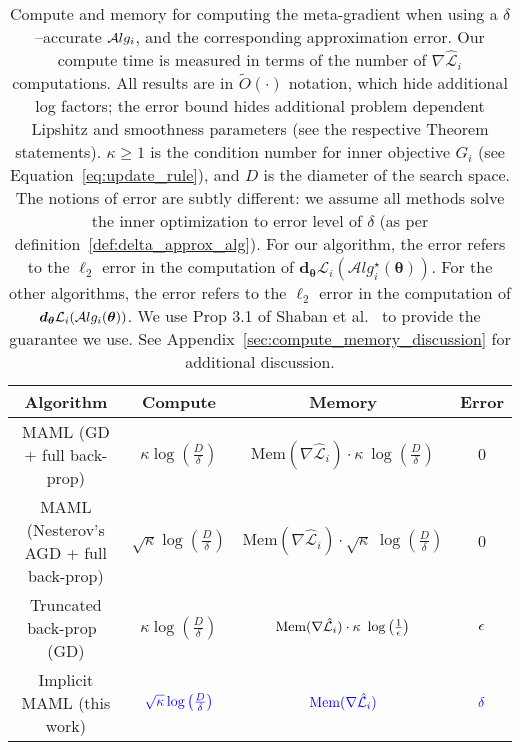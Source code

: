 \documentclass{article} \usepackage[nonatbib, final]{mod_neurips}
\newcommand{\prior}{{\bm{\theta}}}               \newcommand{\priorspace}{\Theta}
\newcommand{\fn}{\mathcal{L}}                  \newcommand{\udfn}{\tilde{\fn}}        \newcommand{\fnht}{\hat{\fn}}        \newcommand{\ud}{\alg}
\newcommand{\algstar}{\mathcal{A}lg^\star}
\newcommand{\grad}{\bm{d}}
\newcommand{\pgrad}{\nabla}
\begin{document}
\begin{table}[t!]
\caption{\label{table:compare}\footnotesize Compute and memory for computing the
  meta-gradient when using a $\delta$--accurate $\mathcal{A}lg_i$, and the
  corresponding approximation error. Our compute time is measured in
  terms of the number of $\pgrad \fnht_i$ computations. All results
  are in $\tilde O(\cdot)$ notation, which hide additional log factors; the error bound hides additional problem dependent Lipshitz and smoothness  parameters (see the respective Theorem statements). 
$\kappa \geq 1$ is the condition number for inner objective $G_i$ (see Equation~\ref{eq:update_rule}), and $D$ is the diameter of the search
space.
The notions
of error are subtly different: we assume all methods solve the inner
optimization to error level of $\delta$ (as per definition~\ref{def:delta_approx_alg}).  For our algorithm, the error refers to the $\ell_2$ error in the computation of $\grad_\prior \fn_i(\algstar_i(\prior)) $. For the other algorithms, the 
error refers to the $\ell_2$ error in the computation of $\grad_\prior
\fn_i(\alg_i(\prior)) $.
We use Prop 3.1 of Shaban et al.~\cite{Shaban2018TruncatedBF} to
provide the guarantee we use. See Appendix~\ref{sec:compute_memory_discussion} for additional discussion.
}
\begin{center}
\footnotesize
\renewcommand{\arraystretch}{1.5}
\begin{tabular}{|c|c|c|c|}
  \hline
Algorithm & Compute & Memory & Error \\ \hline
MAML (GD + full back-prop)  & $\kappa \log \left( \frac{D}{\delta} \right)$    & $\textrm{Mem}({\pgrad \fnht_i})\cdot \kappa \  \log \left( \frac{D}{\delta} \right) $      & $0$  \\ \hline
MAML (Nesterov's AGD + full back-prop)  & $ \sqrt{\kappa} \log \left( \frac{D}{\delta} \right) $    & $\textrm{Mem}({\pgrad \fnht_i})\cdot \sqrt{\kappa} \  \log \left( \frac{D}{\delta} \right) $      & $0$  \\ \hline
Truncated back-prop~\cite{Shaban2018TruncatedBF} (GD)  & $ \kappa \log \left( \frac{D}{\delta} \right) $    & $\textrm{Mem}({\pgrad \fnht_i})\cdot \kappa \  \log \left( \frac{1}{\color{black}{\epsilon}} \right) $      & $\color{black}{\epsilon}$ \\ \hline
Implicit MAML (this work)  &  ${\color{blue} \sqrt{\kappa} \log \left( \frac{D}{\delta} \right)} $       & $\color{blue}{\textrm{Mem}({\pgrad \fnht_i})}$ 
& $\color{blue}{\delta} $ \\ \hline
\end{tabular}
\end{center}

\end{table}
\end{document}
